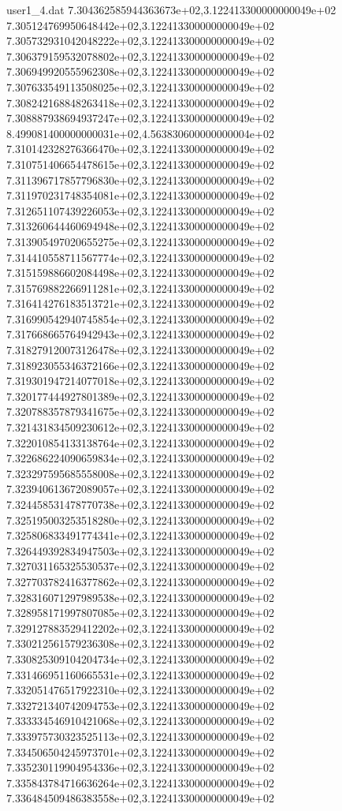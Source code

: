 \begin{filecontents}{user1_4.dat}
7.304362585944363673e+02,3.122413300000000049e+02
7.305124769950648442e+02,3.122413300000000049e+02
7.305732931042048222e+02,3.122413300000000049e+02
7.306379159532078802e+02,3.122413300000000049e+02
7.306949920555962308e+02,3.122413300000000049e+02
7.307633549113508025e+02,3.122413300000000049e+02
7.308242168848263418e+02,3.122413300000000049e+02
7.308887938694937247e+02,3.122413300000000049e+02
8.499081400000000031e+02,4.563830600000000004e+02
7.310142328276366470e+02,3.122413300000000049e+02
7.310751406654478615e+02,3.122413300000000049e+02
7.311396717857796830e+02,3.122413300000000049e+02
7.311970231748354081e+02,3.122413300000000049e+02
7.312651107439226053e+02,3.122413300000000049e+02
7.313260644460694948e+02,3.122413300000000049e+02
7.313905497020655275e+02,3.122413300000000049e+02
7.314410558711567774e+02,3.122413300000000049e+02
7.315159886602084498e+02,3.122413300000000049e+02
7.315769882266911281e+02,3.122413300000000049e+02
7.316414276183513721e+02,3.122413300000000049e+02
7.316990542940745854e+02,3.122413300000000049e+02
7.317668665764942943e+02,3.122413300000000049e+02
7.318279120073126478e+02,3.122413300000000049e+02
7.318923055346372166e+02,3.122413300000000049e+02
7.319301947214077018e+02,3.122413300000000049e+02
7.320177444927801389e+02,3.122413300000000049e+02
7.320788357879341675e+02,3.122413300000000049e+02
7.321431834509230612e+02,3.122413300000000049e+02
7.322010854133138764e+02,3.122413300000000049e+02
7.322686224090659834e+02,3.122413300000000049e+02
7.323297595685558008e+02,3.122413300000000049e+02
7.323940613672089057e+02,3.122413300000000049e+02
7.324458531478770738e+02,3.122413300000000049e+02
7.325195003253518280e+02,3.122413300000000049e+02
7.325806833491774341e+02,3.122413300000000049e+02
7.326449392834947503e+02,3.122413300000000049e+02
7.327031165325530537e+02,3.122413300000000049e+02
7.327703782416377862e+02,3.122413300000000049e+02
7.328316071297989538e+02,3.122413300000000049e+02
7.328958171997807085e+02,3.122413300000000049e+02
7.329127883529412202e+02,3.122413300000000049e+02
7.330212561579236308e+02,3.122413300000000049e+02
7.330825309104204734e+02,3.122413300000000049e+02
7.331466951160665531e+02,3.122413300000000049e+02
7.332051476517922310e+02,3.122413300000000049e+02
7.332721340742094753e+02,3.122413300000000049e+02
7.333334546910421068e+02,3.122413300000000049e+02
7.333975730323525113e+02,3.122413300000000049e+02
7.334506504245973701e+02,3.122413300000000049e+02
7.335230119904954336e+02,3.122413300000000049e+02
7.335843784716636264e+02,3.122413300000000049e+02
7.336484509486383558e+02,3.122413300000000049e+02

\end{filecontents}
